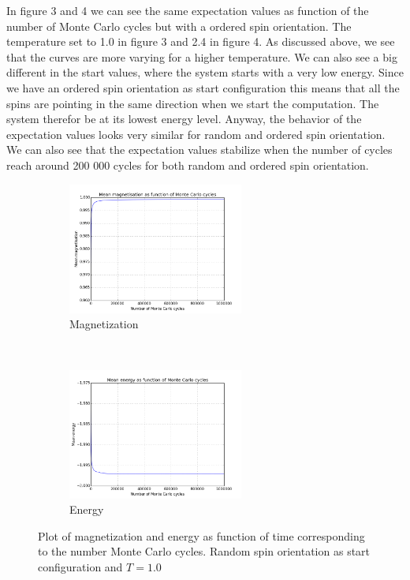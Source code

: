 \documentclass{article}
\begin{document}
\newline \newline In figure 3 and 4 we can see the same expectation values as function of the number of Monte Carlo cycles but with a ordered spin orientation. The temperature set to 1.0 in figure 3 and 2.4 in figure 4. As discussed above, we see that the curves are more varying for a higher temperature. 
We can also see a big different in the start values, where the system starts with a very low energy. Since we have an ordered spin orientation as start configuration this means that all the spins are pointing in the same direction when we start the computation. The system therefor be at its lowest energy level. Anyway, the behavior of the expectation values looks very similar for random and ordered spin orientation. \newline
We can also see that the expectation values stabilize when the number of cycles reach around 200 000 cycles for both random and ordered spin orientation. 
\begin{figure}[t!]
    \centering
    \begin{subfigure}[t]{0.6\textwidth}
        \centering
        \includegraphics[height=1.7in]{4cmagnetisationrandom.png}
        \caption{Magnetization}
    \end{subfigure}%
    ~ 
    \begin{subfigure}[t]{0.6\textwidth}
        \centering
        \includegraphics[height=1.7in]{4cenergyrandom.png}
        \caption{Energy}
    \end{subfigure}
    \caption{Plot of magnetization and energy as function of time corresponding to the number Monte Carlo cycles. Random spin orientation as start configuration and $T = 1.0$}
\end{figure}
\end{document}
